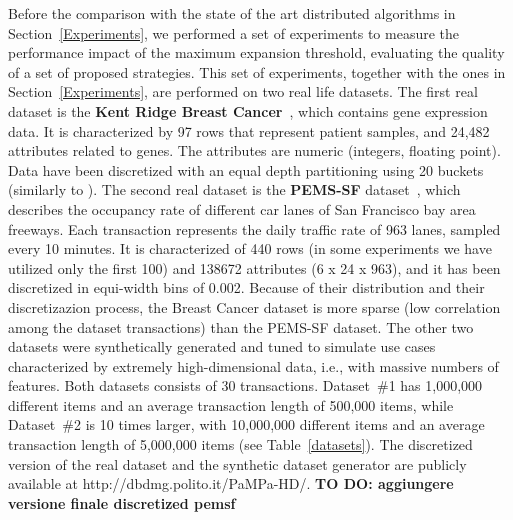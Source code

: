 Before the comparison with the state of the art distributed algorithms in Section~\ref{Experiments}, we performed a set of experiments to measure the performance impact of the maximum expansion threshold, evaluating the quality of a set of proposed strategies. This set of experiments, together with the ones in Section~\ref{Experiments}, are performed on two real life datasets.
The first real dataset is the \textbf{Kent Ridge Breast Cancer}~\cite{breast_cancer_dataset}, which contains gene expression data.
It is characterized by 97 rows that represent patient samples, and
24,482 attributes related to genes. The attributes are numeric (integers, floating point).
Data have been discretized with an equal depth partitioning
using 20 buckets (similarly to \cite{Zaki_Carpenter}).
The second real dataset is the \textbf{PEMS-SF} dataset~\cite{breast_cancer_dataset}, 
which describes the occupancy rate of different car lanes of San Francisco bay area freeways.
Each transaction represents the daily traffic rate of 963 lanes, sampled every 10 minutes.
It is characterized of 440 rows (in some experiments we have utilized only the first 100) and 138672 attributes (6 x 24 x 963), and it has been discretized in
equi-width bins of 0.002.
Because of their distribution and their discretizazion process, the Breast Cancer dataset is more sparse (low correlation among the dataset transactions) than the PEMS-SF dataset. 
The other two datasets were synthetically generated and tuned to simulate
use cases characterized by extremely high-dimensional data,
i.e., with massive numbers of features.
Both datasets consists of 30 transactions.
Dataset~\#1 has 1,000,000 different items
and an average transaction length of 500,000 items,
while
Dataset~\#2 is 10 times larger, with 10,000,000 different items
and an average transaction length of 5,000,000 items
(see Table~\ref{datasets}).
The discretized version of the real dataset and the synthetic dataset generator
are publicly available at http://dbdmg.polito.it/PaMPa-HD/. \textbf{TO DO: aggiungere versione finale discretized pemsf}



